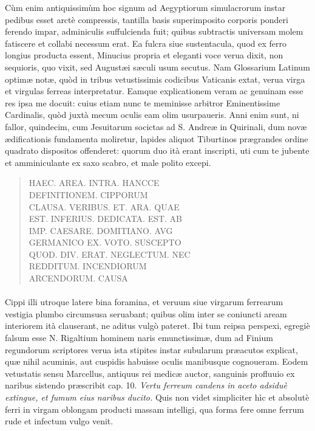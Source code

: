 \documentclass[a4paper, 11pt, oneside, polutonikogreek, latin]{article}
\begin{document}
Cùm enim antiquissimùm hoc signum ad Aegyptiorum simulacrorum instar pedibus esset arctè compressis, tantilla basis superimposito corporis ponderi ferendo impar, adminiculis suffulcienda fuit; quibus subtractis universam molem fatiscere et collabi necessum erat. Ea fulcra siue sustentacula, quod ex ferro longius producta essent, Minucius propria et eleganti voce verua dixit, non sequioris, quo vixit, sed Augustæi sæculi usum secutus. Nam Glossarium Latinum optimæ notæ, quòd in tribus vetustissimis codicibus Vaticanis extat, verua virga et virgulas ferreas interpretatur. Eamque explicationem veram ac genuinam esse res ipsa me docuit: cuius etiam nunc te meminisse arbitror Eminentissime Cardinalis, quòd juxtà mecum oculis eam olim usurpaueris. Anni enim sunt, ni fallor, quindecim, cum Jesuitarum socictas ad S. Andreæ in Quirinali, dum novæ ædificationis fundamenta moliretur, lapides aliquot Tiburtinos prægrandes ordine quadrato dispositos offenderet: quorum duo ità erant inscripti, uti cum te jubente et amminiculante ex saxo scabro, et male polito excepi.
\begin{quote}
HAEC. AREA. INTRA. HANCCE\\
DEFINITIONEM. CIPPORUM\\
CLAUSA. VERIBUS. ET. ARA. QUAE\\
EST. INFERIUS. DEDICATA. EST. AB\\
IMP. CAESARE. DOMITIANO. AVG\\
GERMANICO EX. VOTO. SUSCEPTO\\
QUOD. DIV. ERAT. NEGLECTUM. NEC\\
REDDITUM. INCENDIORUM\\
ARCENDORUM. CAUSA\\
\end{quote}
\paragraph{}
Cippi illi utroque latere bina foramina, et veruum siue virgarum ferrearum vestigia plumbo circumsusa seruabant; quibus olim inter se coniuncti aream interiorem ità clauserant, ne aditus vulgò pateret. Ibi tum reipsa perspexi, egregiè falsum esse N. Rigaltium hominem naris emunctissimæ, dum ad Finium regundorum scriptores verua ista stipites instar subularum præacutos explicat, quæ nihil acuminis, aut cuspidis habuisse oculis manibusque cognoueram. Eodem vetustatis sensu Marcellus, antiquus rei medicæ auctor, sanguinis profluuio ex naribus sistendo præscribit cap. 10. \emph{Vertu ferreum candens in aceto adsiduè extingue, et fumum eius naribus ducito.} Quis non videt simpliciter hìc et absolutè ferri in virgam oblongam producti massam intelligi, qua forma fere omne ferrum rude et infectum vulgo venit.
\end{document}
